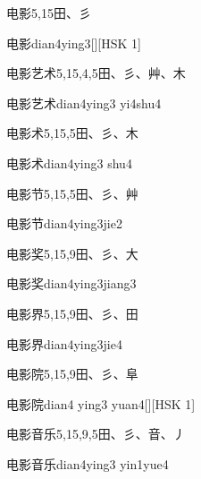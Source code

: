\begin{entry}{电影}{5,15}{⽥、⼺}
  \begin{phonetics}{电影}{dian4ying3}[][HSK 1]
  \end{phonetics}
\end{entry}

\begin{entry}{电影艺术}{5,15,4,5}{⽥、⼺、⾋、⽊}
  \begin{phonetics}{电影艺术}{dian4ying3 yi4shu4}
  \end{phonetics}
\end{entry}

\begin{entry}{电影术}{5,15,5}{⽥、⼺、⽊}
  \begin{phonetics}{电影术}{dian4ying3 shu4}
  \end{phonetics}
\end{entry}

\begin{entry}{电影节}{5,15,5}{⽥、⼺、⾋}
  \begin{phonetics}{电影节}{dian4ying3jie2}
  \end{phonetics}
\end{entry}

\begin{entry}{电影奖}{5,15,9}{⽥、⼺、⼤}
  \begin{phonetics}{电影奖}{dian4ying3jiang3}
  \end{phonetics}
\end{entry}

\begin{entry}{电影界}{5,15,9}{⽥、⼺、⽥}
  \begin{phonetics}{电影界}{dian4ying3jie4}
  \end{phonetics}
\end{entry}

\begin{entry}{电影院}{5,15,9}{⽥、⼺、⾩}
  \begin{phonetics}{电影院}{dian4 ying3 yuan4}[][HSK 1]
  \end{phonetics}
\end{entry}

\begin{entry}{电影音乐}{5,15,9,5}{⽥、⼺、⾳、⼃}
  \begin{phonetics}{电影音乐}{dian4ying3 yin1yue4}
  \end{phonetics}
\end{entry}

